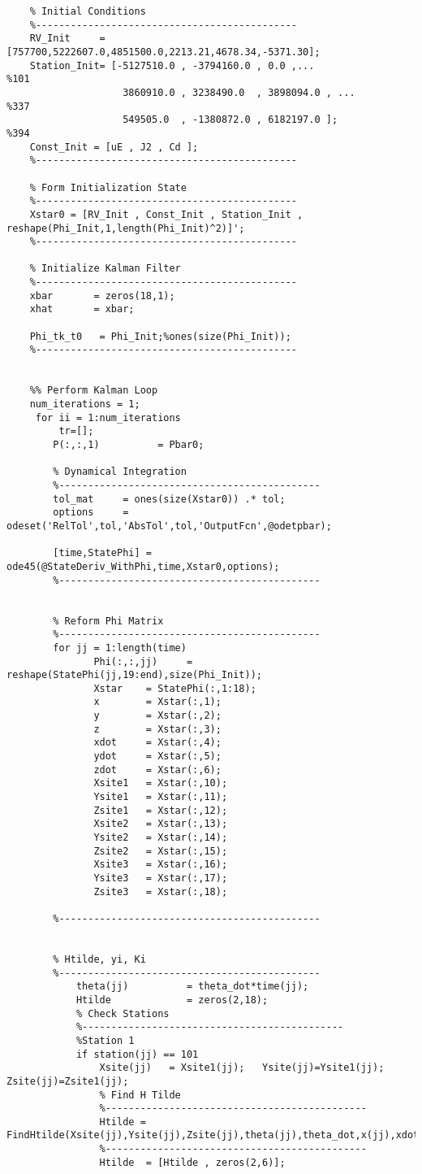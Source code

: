 \documentclass[]{article}
\begin{document}
\begin{appendix}
\begin{lstlisting}
	% Initial Conditions
	%---------------------------------------------
	RV_Init     = [757700,5222607.0,4851500.0,2213.21,4678.34,-5371.30];
	Station_Init= [-5127510.0 , -3794160.0 , 0.0 ,...               %101
	                3860910.0 , 3238490.0  , 3898094.0 , ...        %337
	                549505.0  , -1380872.0 , 6182197.0 ];           %394
	Const_Init = [uE , J2 , Cd ];
	%---------------------------------------------
	
	% Form Initialization State
	%---------------------------------------------
	Xstar0 = [RV_Init , Const_Init , Station_Init , reshape(Phi_Init,1,length(Phi_Init)^2)]';
	%---------------------------------------------
	
	% Initialize Kalman Filter
	%---------------------------------------------
	xbar       = zeros(18,1);
	xhat       = xbar;
	
	Phi_tk_t0   = Phi_Init;%ones(size(Phi_Init));
	%---------------------------------------------
	
	
	%% Perform Kalman Loop
	num_iterations = 1;
	 for ii = 1:num_iterations
	     tr=[];
	    P(:,:,1)          = Pbar0;
	    
	    % Dynamical Integration
	    %---------------------------------------------
	    tol_mat     = ones(size(Xstar0)) .* tol;
	    options     = odeset('RelTol',tol,'AbsTol',tol,'OutputFcn',@odetpbar);
	
	    [time,StatePhi] = ode45(@StateDeriv_WithPhi,time,Xstar0,options);
	    %---------------------------------------------
	    
	   
	    % Reform Phi Matrix
	    %---------------------------------------------
	    for jj = 1:length(time)
	           Phi(:,:,jj)     = reshape(StatePhi(jj,19:end),size(Phi_Init));
	           Xstar    = StatePhi(:,1:18);
	           x        = Xstar(:,1);
	           y        = Xstar(:,2);
	           z        = Xstar(:,3);
	           xdot     = Xstar(:,4);
	           ydot     = Xstar(:,5);
	           zdot     = Xstar(:,6);
	           Xsite1   = Xstar(:,10);
	           Ysite1   = Xstar(:,11);
	           Zsite1   = Xstar(:,12);
	           Xsite2   = Xstar(:,13);
	           Ysite2   = Xstar(:,14);
	           Zsite2   = Xstar(:,15);
	           Xsite3   = Xstar(:,16);
	           Ysite3   = Xstar(:,17);
	           Zsite3   = Xstar(:,18);
	
	    %---------------------------------------------
	    
	    
	    % Htilde, yi, Ki
	    %---------------------------------------------
	        theta(jj)          = theta_dot*time(jj);
	        Htilde             = zeros(2,18);
	        % Check Stations
	        %---------------------------------------------
	        %Station 1
	        if station(jj) == 101
	            Xsite(jj)   = Xsite1(jj);   Ysite(jj)=Ysite1(jj);   Zsite(jj)=Zsite1(jj);
	            % Find H Tilde
	            %---------------------------------------------
	            Htilde = FindHtilde(Xsite(jj),Ysite(jj),Zsite(jj),theta(jj),theta_dot,x(jj),xdot(jj),y(jj),ydot(jj),z(jj),zdot(jj));
	            %---------------------------------------------
	            Htilde  = [Htilde , zeros(2,6)];
	            

\end{lstlisting}
\end{appendix}
\end{document}
